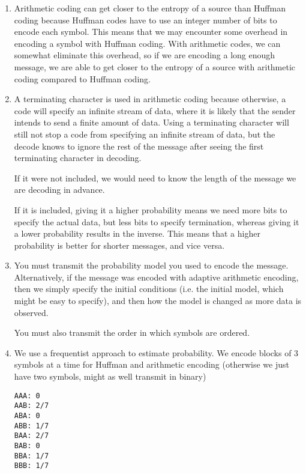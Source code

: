 \begin{enumerate}
    \item
      Arithmetic coding can get closer to the entropy of a source than Huffman coding because Huffman codes have to use an integer number of bits to encode each symbol. This means that we may encounter some overhead in encoding a symbol with Huffman coding. With arithmetic codes, we can somewhat eliminate this overhead, so if we are encoding a long enough message, we are able to get closer to the entropy of a source with arithmetic coding compared to Huffman coding.

      \item
        A terminating character is used in arithmetic coding because otherwise, a code will specify an infinite stream of data, where it is likely that the sender intends to send a finite amount of data. Using a terminating character will still not stop a code from specifying an infinite stream of data, but the decode knows to ignore the rest of the message after seeing the first terminating character in decoding.

        If it were not included, we would need to know the length of the message we are decoding in advance.

        If it is included, giving it a higher probability means we need more bits to specify the actual data, but less bits to specify termination, whereas giving it a lower probability results in the inverse. This means that a higher probability is better for shorter messages, and vice versa.

        \item
          You must transmit the probability model you used to encode the message. Alternatively, if the message was encoded with adaptive arithmetic encoding, then we simply specify the initial conditions (i.e. the initial model, which might be easy to specify), and then how the model is changed as more data is observed.

          You must also transmit the order in which symbols are ordered.

          \item

            We use a frequentist approach to estimate probability. We encode blocks of 3 symbols at a time for Huffman and arithmetic encoding (otherwise we just have two symbols, might as well transmit in binary)
\begin{verbatim}
AAA: 0
AAB: 2/7
ABA: 0
ABB: 1/7
BAA: 2/7
BAB: 0
BBA: 1/7
BBB: 1/7
\end{verbatim}


\end{enumerate}
